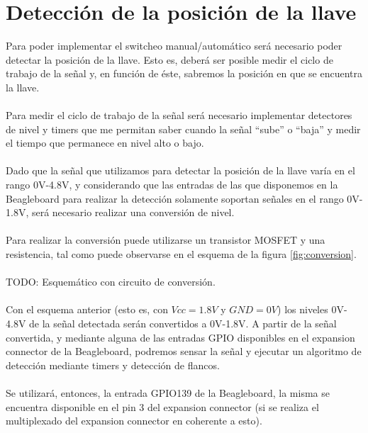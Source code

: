 \documentclass[main]{subfiles}
\begin{document}
\section{Detección de la posición de la llave}

Para poder implementar el switcheo manual/automático será necesario poder detectar la posición de la llave. Esto es, deberá ser posible medir el ciclo de trabajo de la señal y, en función de éste, sabremos la posición en que se encuentra la llave.\\
\\
Para medir el ciclo de trabajo de la señal será necesario implementar detectores de nivel y timers que me permitan saber cuando la señal ``sube'' o ``baja'' y medir el tiempo que permanece en nivel alto o bajo.\\
\\
Dado que la señal que utilizamos para detectar la posición de la llave varía en el rango 0V-4.8V, y considerando que las entradas de las que disponemos en la Beagleboard para realizar la detección solamente soportan señales en el rango 0V-1.8V, será necesario realizar una conversión de nivel.\\
\\
Para realizar la conversión puede utilizarse un transistor MOSFET y una resistencia, tal como puede observarse en el esquema de la figura \ref{fig:conversion}.\\
\\
TODO: Esquemático con circuito de conversión.\\
\\
Con el esquema anterior (esto es, con $Vcc=1.8V$ y $GND=0V$) los niveles 0V-4.8V de la señal detectada serán convertidos a 0V-1.8V. A partir de la señal convertida, y mediante alguna de las entradas GPIO disponibles en el expansion connector de la Beagleboard, podremos sensar la señal y ejecutar un algoritmo de detección mediante timers y detección de flancos.\\
\\
Se utilizará, entonces, la entrada GPIO139 de la Beagleboard, la misma se encuentra disponible en el pin 3 del expansion connector (si se realiza el multiplexado del expansion connector en coherente a esto).
\end{document}
